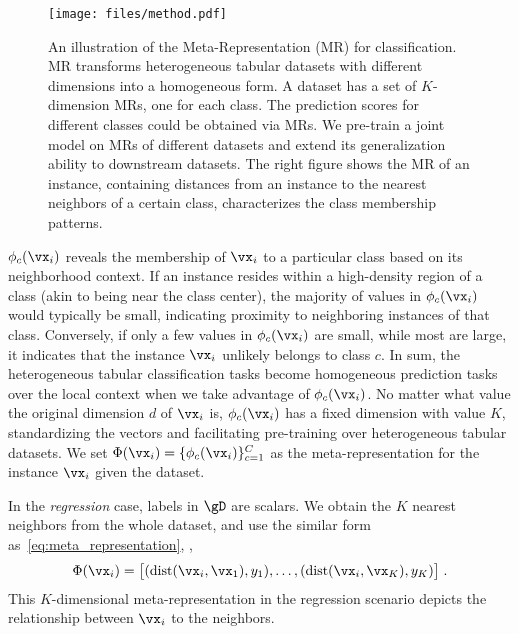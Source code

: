 \begin{figure*}
    \centering
\texttt{[image: files/method.pdf]}
    \vspace{-3mm}
    \caption{An illustration of the Meta-Representation (MR) for classification. MR transforms heterogeneous tabular datasets with different dimensions into a homogeneous form. 
    A dataset has a set of $K$-dimension MRs, one for each class. 
    The prediction scores for different classes could be obtained via MRs. We pre-train a joint model on MRs of different datasets and extend its generalization ability to downstream datasets.
    The right figure shows the MR of an instance, containing distances from an instance to the nearest neighbors of a certain class, characterizes the class membership patterns.}
    \label{fig:meta_representation}
    \vspace{-5mm}
\end{figure*}

$\phi_c(\vx_i)$ reveals the membership of $\vx_i$ to a particular class based on its neighborhood context. 
If an instance resides within a high-density region of a class (akin to being near the class center), the majority of values in $\phi_c(\vx_i)$ would typically be small, indicating proximity to neighboring instances of that class.
Conversely, if only a few values in $\phi_c(\vx_i)$ are small, while most are large, it indicates that the instance $\vx_i$ unlikely belongs to class $c$.
In sum, the heterogeneous tabular classification tasks become homogeneous prediction tasks over the local context when we take advantage of $\phi_c(\vx_i)$. No matter what value the original dimension $d$ of $\vx_i$ is, $\phi_c(\vx_i)$ has a fixed dimension with value $K$, standardizing the vectors and facilitating pre-training over heterogeneous tabular datasets. 
We set $\Phi(\vx_i)=\{\phi_c(\vx_i)\}_{c=1}^C$ as the meta-representation for the instance $\vx_i$ given the dataset.

In the {\em regression} case, labels in $\gD$ are scalars. We obtain the $K$ nearest neighbors from the whole dataset, and use the similar form as~\autoref{eq:meta_representation}, \ie, 
\begin{equation}
    \Phi(\vx_i) = \big[(\operatorname{dist}(\vx_i, \vx_1), y_1),\ldots,(\operatorname{dist}(\vx_i, \vx_{K}), y_K)\big]\;.\label{eq:meta_representation_reg}
\end{equation}
This $K$-dimensional meta-representation in the regression scenario depicts the relationship between $\vx_i$ to the neighbors. 

